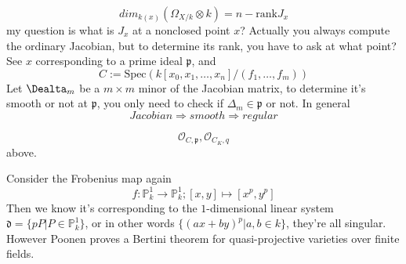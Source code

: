 \documentclass[../main.tex]{subfiles}
\begin{document}
\begin{remark}
$$dim_{k(x)}(\Omega_{X/k}\otimes k)=n-\mathrm{rank}J_{x}$$
my question is what is $J_{x}$ at a nonclosed point $x$? Actually you always compute the ordinary Jacobian, but to determine its rank, you have to ask at what point? See $x$ corresponding to a prime ideal $\mathfrak{p}$, and $$C:=\mathrm{Spec}(k[x_{0},x_{1},\dots, x_{n}]/(f_{1},\dots, f_{m}))$$
Let $\Dealta_{m}$ be a $m\times m$ minor of the Jacobian matrix, to determine it's smooth or not at $\mathfrak{p}$, you only need to check if $\Delta_{m}\in \mathfrak{p}$ or not. In general 
$$Jacobian \Rightarrow smooth \Rightarrow regular$$
\end{remark}



\begin{remark}
\end{remark}

\begin{example}
$$\mathcal{O}_{C,\mathfrak{p}}, \mathcal{O}_{C_{K},q}$$
above.
\end{example}


\begin{example}
Consider the Frobenius map again
$$f:\mathbb{P}_{k}^{1}\rightarrow \mathbb{P}_{k}^{1}; [x,y]\mapsto [x^{p},y^{p}]$$
Then we know it's corresponding to the $1$-dimensional linear system $\mathfrak{d}=\{pP|P\in\mathbb{P}_{k}^{1}\}$, or in other words $\{(ax+by)^{p}|a,b\in k\}$, they're all singular. However Poonen proves a Bertini theorem for quasi-projective varieties over finite fields.
\end{example}
\end{document}
